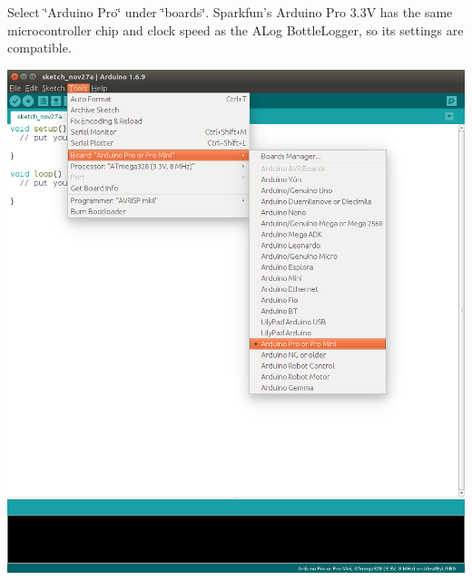 \begin{DoxyEnumerate}
\item Select \char`\"{}\+Arduino Pro\char`\"{} under \char`\"{}boards\char`\"{}. Sparkfun’s Arduino Pro 3.\+3V has the same microcontroller chip and clock speed as the A\+Log Bottle\+Logger, so its settings are compatible.  
\begin{DoxyImage}
\includegraphics[width=.8\linewidth]{BoardsSelect_ArduinoPro.png}
\end{DoxyImage}


\end{DoxyEnumerate}
